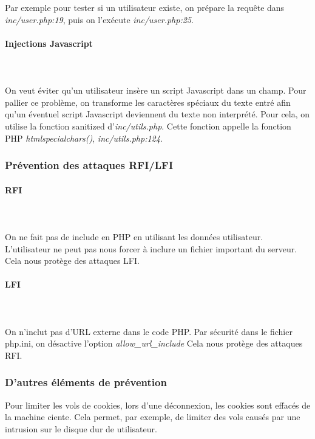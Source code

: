 \documentclass[a4paper]{article}
\begin{document}
Par exemple pour tester si un utilisateur existe, on prépare la requête
dans \textit{inc/user.php:19}, puis on l'exécute \textit{inc/user.php:25}.

\paragraph{Injections Javascript}
~~\\
\\
On veut éviter qu'un utilisateur insère un script Javascript dans un champ.
Pour pallier ce problème, on transforme les caractères spéciaux du texte entré afin
qu'un éventuel script Javascript deviennent du texte non interprété.
Pour cela, on utilise la fonction sanitized d'\textit{inc/utils.php}. Cette fonction
appelle la fonction PHP \textit{htmlspecialchars()}, \textit{inc/utils.php:124}.
		
\subsubsection{Prévention des attaques RFI/LFI}
		
\paragraph{RFI}
~~\\
\\
On ne fait pas de include en PHP en utilisant les données utilisateur.
L'utilisateur ne peut pas nous forcer à inclure un fichier important du serveur.
Cela nous protège des attaques LFI.

\paragraph{LFI}
~~\\
\\
On n'inclut pas d'URL externe dans le code PHP.
Par sécurité dans le fichier php.ini, on désactive l'option \textit{allow\_url\_include} 
Cela nous protège des attaques RFI.
		
\subsubsection{D'autres éléments de prévention}

Pour limiter les vols de cookies, lors d'une déconnexion, les cookies sont
effacés de la machine ciente. Cela permet, par exemple, de limiter des vols
causés par une intrusion sur le disque dur de utilisateur.
\end{document}
